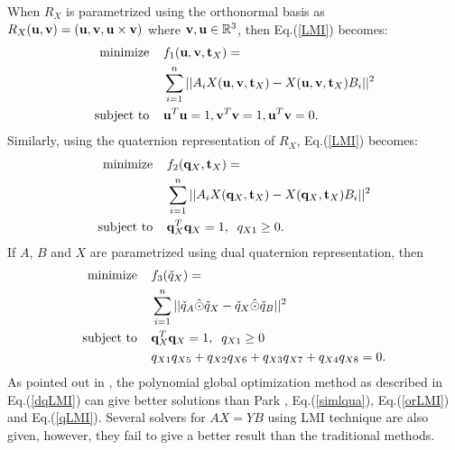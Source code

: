 \documentclass[twocolumn,10pt]{asme2ej}
\newcommand{\uu}{{\bf u}}
\newcommand{\vv}{{\bf v}}
\newcommand{\ttt}{{\bf t}}
\newcommand{\qq}{{\bf q}}
\begin{document}
When $R_X$ is parametrized using the orthonormal basis as $R_{X}(\uu, \vv) = ( \uu, \vv, \uu \times \vv)$ where $\vv, \uu \in \mathbb{R}^{3}$, then Eq.(\ref{LMI}) becomes:
\begin{equation}
\begin{split}
\text{minimize} \; \; \; \;&f_{1}(\uu, \vv, \ttt_{X}) = \\
&\sum_{i=1}^n ||A_i X(\uu,\vv,\ttt_{X}) - X(\uu,\vv,\ttt_{X})B_i ||^2\\
\text{subject to} \; \; \; \; &\uu^{T}\uu = 1, \vv^{T}\vv = 1, \uu^{T}\vv = 0.
\end{split}
\label{orLMI}
\end{equation}
Similarly, using the quaternion representation of $R_{X}$, Eq.(\ref{LMI}) becomes:
\begin{equation}
\begin{split}
\text{minimize} \; \; \; \; &f_{2}(\qq_{X}, \ttt_{X}) = \\
& \sum_{i=1}^{n}||A_iX(\qq_{X}, \ttt_{X}) - X(\qq_{X}, \ttt_{X})B_i||^{2}\\
\text{subject to} \; \; \; \; &\qq_{X}^{T}\qq_{X} = 1, \; \; q_{X1} \geq 0.
\end{split}
\label{qLMI}
\end{equation}
If $A$, $B$ and $X$ are parametrized using dual quaternion representation, then
\begin{equation}
\begin{split}
\text{minimize} \; \; \; \; &f_{3}(\check{q}_{X}) = \\
 & \sum_{i=1}^{n}||\check{q}_{A} \hat{\odot} \check{q}_{X}- \check{q}_{X} \hat{\odot} \check{q}_{B}||^{2}\\
\text{subject to} \; \; \; \; &\qq_{X}^{T}\qq_{X} = 1, \; \; q_{X1} \geq 0 \\
&q_{X1}q_{X5} + q_{X2}q_{X6} + q_{X3}q_{X7} + q_{X4}q_{X8} = 0.
\end{split}
\label{dqLMI}
\end{equation} 
As pointed out in \cite{heller2014hand}, the polynomial global optimization method as described in Eq.(\ref{dqLMI}) can give better solutions than Park \cite{park1994robot}, Eq.(\ref{simlqua}), Eq.(\ref{orLMI}) and Eq.(\ref{qLMI}). Several solvers for $AX=YB$ using LMI technique are also given, however,  they fail to give a better result than the traditional methods.
\end{document}
